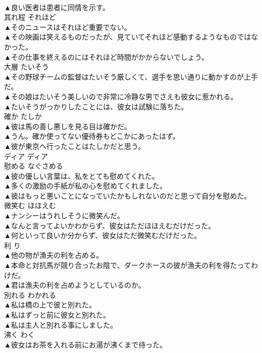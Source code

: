 \documentclass[8pt]{extreport}
\begin{document}
\begin{CJK}{UTF8}{min}
\\	▲良い医者は患者に同情を示す。 
\\	其れ程	それほど	
\\	▲そのニュースはそれほど重要でない。 
\\	▲その映画は笑えるものだったが、見ていてそれほど感動するようなものではなかった。 
\\	▲その仕事を終えるのにはそれほど時間がかからないでしょう。 
\\	大層	たいそう	
\\	▲その野球チームの監督はたいそう厳しくて、選手を思い通りに動かすのが上手だ。 
\\	▲その娘はたいそう美しいので非常に冷静な男でさえも彼女に惹かれる。 
\\	▲たいそうがっかりしたことには、彼女は試験に落ちた。 
\\	確か	たしか	
\\	▲彼は馬の善し悪しを見る目は確かだ。 
\\	▲うん。確か使ってない優待券もどこかにあったはず。 
\\	▲彼が東京へ行ったことはたしかだと思う。 
\\	ディア	ディア	
\\	慰める	なぐさめる	
\\	▲彼の優しい言葉は、私をとても慰めてくれた。 
\\	▲多くの激励の手紙が私の心を慰めてくれました。 
\\	▲彼はもっと悪いことになっていたかもしれないのだと思って自分を慰めた。 
\\	微笑む	ほほえむ	
\\	▲ナンシーはうれしそうに微笑んだ。 
\\	▲なんと言ってよいかわからず、彼女はただほほえむだけだった。 
\\	▲何といって良いか分からず、彼女はただ微笑むだけだった。 
\\	利	り	
\\	▲他の物が漁夫の利を占める。 
\\	▲本命と対抗馬が競り合ったお陰で、ダークホースの彼が漁夫の利を得たってわけだ。 
\\	▲君は漁夫の利を占めようとしているのか。 
\\	別れる	わかれる	
\\	▲私は橋の上で彼と別れた。 
\\	▲私はずっと前に彼女と別れた。 
\\	▲私は主人と別れる事にしました。 
\\	沸く	わく	
\\	▲彼女はお茶を入れる前にお湯が沸くまで待った。 

\end{CJK}
\end{document}
